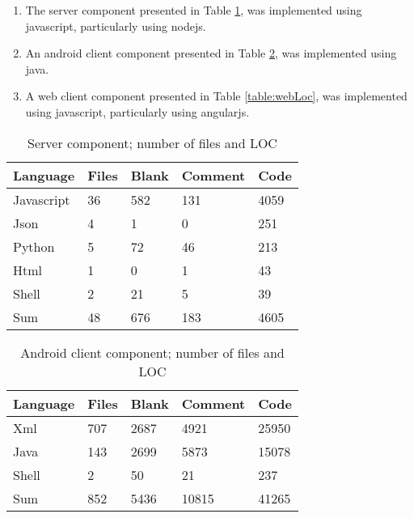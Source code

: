 \documentclass[english,12pt,a4paper,pdftex,sci,utf8]{aaltothesis}
\begin{document}
\begin{enumerate}[label=\textbf{C\arabic*}]
\item The server component presented in Table \ref{table:serverLoc}, was implemented using javascript, particularly using nodejs.

\item An android client component presented in Table \ref{table:androidLoc}, was implemented using java.
    
\item A web client component presented in Table \ref{table:webLoc}, was implemented using javascript, particularly using angularjs.
\end{enumerate}

\begin{table}[ht!]
\centering
\caption{Server component; number of files and \gls{LOC}}
\label{table:serverLoc}
    \begin{tabular}{ |p{3cm} p{2cm} p{2cm} p{2cm} p{2cm}|  }
     \hline
     Language       &Files  &Blank  &Comment    &Code\\
     \hline
     \hline
     Javascript     &36     &582    &131        &4059\\
     Json           &4      &1      &0          &251\\
     Python         &5      &72     &46         &213\\
     Html           &1      &0      &1          &43\\
     Shell          &2      &21     &5          &39\\
     \hline\hline
     Sum            &48     &676    &183        &4605\\
     \hline
    \end{tabular}
\end{table}

\begin{table}[ht!]
\centering
\caption{Android client component; number of files and \gls{LOC}}
\label{table:androidLoc}
    \begin{tabular}{ |p{3cm} p{2cm} p{2cm} p{2cm} p{2cm}|  }
     \hline
     Language       &Files  &Blank  &Comment    &Code\\
     \hline\hline
     Xml            &707    &2687   &4921       &25950\\
     Java           &143    &2699   &5873       &15078\\
     Shell          &2      &50     &21         &237\\
     \hline\hline
     Sum            &852    &5436   &10815      &41265\\
     \hline
    \end{tabular}
\end{table}
\end{document}
